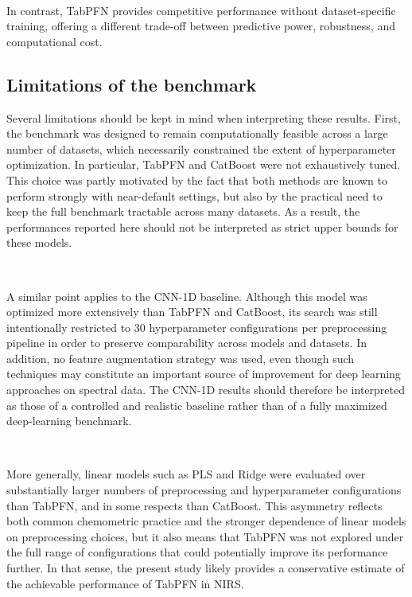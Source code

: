 \documentclass{article}
\begin{document}
~

In contrast, TabPFN provides competitive performance without dataset-specific training, offering a different trade-off between predictive power, robustness, and computational cost.

\subsection{Limitations of the benchmark}

Several limitations should be kept in mind when interpreting these results. First, the benchmark was designed to remain computationally feasible across a large number of datasets, which necessarily constrained the extent of hyperparameter optimization. In particular, TabPFN and CatBoost were not exhaustively tuned. This choice was partly motivated by the fact that both methods are known to perform strongly with near-default settings, but also by the practical need to keep the full benchmark tractable across many datasets. As a result, the performances reported here should not be interpreted as strict upper bounds for these models.

~

A similar point applies to the CNN-1D baseline. Although this model was optimized more extensively than TabPFN and CatBoost, its search was still intentionally restricted to 30 hyperparameter configurations per preprocessing pipeline in order to preserve comparability across models and datasets. In addition, no feature augmentation strategy was used, even though such techniques may constitute an important source of improvement for deep learning approaches on spectral data. The CNN-1D results should therefore be interpreted as those of a controlled and realistic baseline rather than of a fully maximized deep-learning benchmark.

~

More generally, linear models such as PLS and Ridge were evaluated over substantially larger numbers of preprocessing and hyperparameter configurations than TabPFN, and in some respects than CatBoost. This asymmetry reflects both common chemometric practice and the stronger dependence of linear models on preprocessing choices, but it also means that TabPFN was not explored under the full range of configurations that could potentially improve its performance further. In that sense, the present study likely provides a conservative estimate of the achievable performance of TabPFN in NIRS.

~
\end{document}
